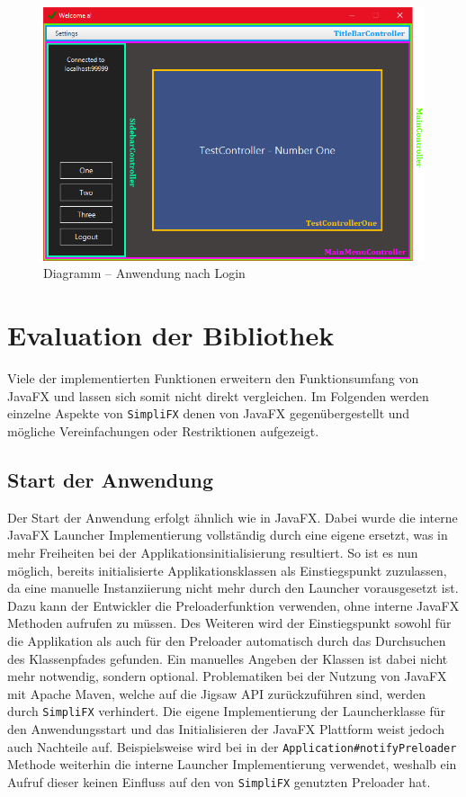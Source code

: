 \begin{figure}[H]
	\centering
	\includegraphics[width=\textwidth]{Abbildungen/MainMenu Screen.png}
	\caption{Diagramm -- Anwendung nach Login}
	\label{fig:mainmenu_controller_demo}
\end{figure}
\section{Evaluation der Bibliothek}
Viele der implementierten Funktionen erweitern den Funktionsumfang von JavaFX und lassen sich somit nicht direkt vergleichen. Im Folgenden werden einzelne Aspekte von \texttt{SimpliFX} denen von JavaFX gegenübergestellt und mögliche Vereinfachungen oder Restriktionen aufgezeigt.
\subsection{Start der Anwendung}
Der Start der Anwendung erfolgt ähnlich wie in JavaFX. Dabei wurde die interne JavaFX Launcher Implementierung vollständig durch eine eigene ersetzt, was in mehr Freiheiten bei der Applikationsinitialisierung resultiert. So ist es nun möglich, bereits initialisierte Applikationsklassen als Einstiegspunkt zuzulassen, da eine manuelle Instanziierung nicht mehr durch den Launcher vorausgesetzt ist. Dazu kann der Entwickler die Preloaderfunktion verwenden, ohne interne JavaFX Methoden aufrufen zu müssen. Des Weiteren wird der Einstiegspunkt sowohl für die Applikation als auch für den Preloader automatisch durch das Durchsuchen des Klassenpfades gefunden. Ein manuelles Angeben der Klassen ist dabei nicht mehr notwendig, sondern optional. Problematiken bei der Nutzung von JavaFX mit Apache Maven, welche auf die Jigsaw API zurückzuführen sind, werden durch \texttt{SimpliFX} verhindert. Die eigene Implementierung der Launcherklasse für den Anwendungsstart und das Initialisieren der JavaFX Plattform weist jedoch auch Nachteile auf. Beispielsweise wird bei in der \texttt{Application\#notifyPreloader} Methode weiterhin die interne Launcher Implementierung verwendet, weshalb ein Aufruf dieser keinen Einfluss auf den von \texttt{SimpliFX} genutzten Preloader hat.
